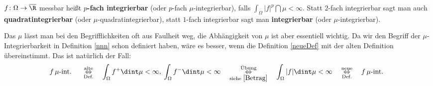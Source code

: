 \begin{deff}\label{neueDef}
	$f \colon \Omega \to \overline{\R}$ messbar heißt \textbf{$p$-fach integrierbar} (oder $p$-fach $\mu$-integrierbar), falls $ \int_{\Omega} |f|^p \dint \mu < \infty$. Statt $2$-fach integrierbar sagt man auch \textbf{quadratintegrierbar} (oder $\mu$-quadratintegrierbar), statt $1$-fach integrierbar sagt man \textbf{integrierbar} (oder $\mu$-integrierbar). 
\end{deff}
Das $\mu$ l\"asst man bei den Begrifflichkeiten oft aus Faulheit weg, die Abh\"angigkeit von $\mu$ ist aber essentiell wichtig. Da wir den Begriff der $\mu$-Integrierbarkeit in Definition \ref{nnn} schon definiert haben, w\"are es besser, wenn die Definition \ref{neueDef} mit der alten Definition \"ubereinstimmt. Das ist nat\"urlich der Fall:
	\begin{gather*}
	f\,\mu\text{-int. } \quad\overset{\text{alte}}{\underset{\text{Def.}}{\Leftrightarrow}} \quad\int_{\Omega} f^+ \dint \mu < \infty, \: \int_{\Omega} f^- \dint \mu < \infty \quad\overset{\text{\"Ubung}}{\underset{\text{siehe }  \eqref{Betrag}}{\Leftrightarrow}} \quad\int_{\Omega} |f| \dint \mu < \infty \quad \overset{\text{neue}}{\underset{\text{Def.}}{\Leftrightarrow}} \quad f\,\mu\text{-int. }
	\end{gather*}

